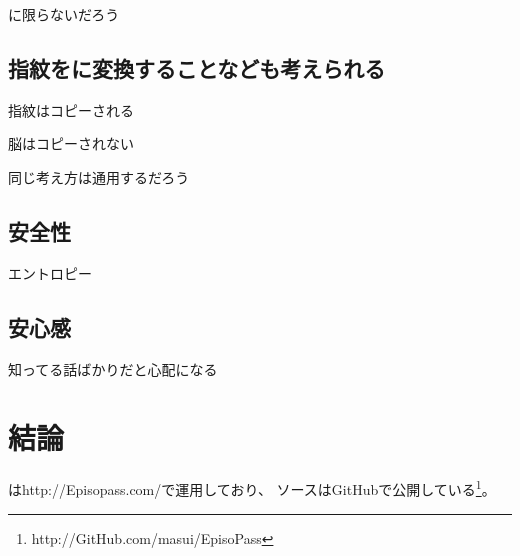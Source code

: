 \documentclass[twoside]{wiss}
\begin{document}
{\PW}に限らないだろう

\subsection{指紋を{\PW}に変換することなども考えられる}

指紋はコピーされる

脳はコピーされない

同じ考え方は通用するだろう

\subsection{安全性}

エントロピー

\subsection{安心感}

知ってる話ばかりだと心配になる

\section{結論}

{\EP}は\textsf{http://Episopass.com/}で運用しており、
ソースはGitHubで公開している\footnote{
  \textsf{http://GitHub.com/masui/EpisoPass}
}。



\end{document}
